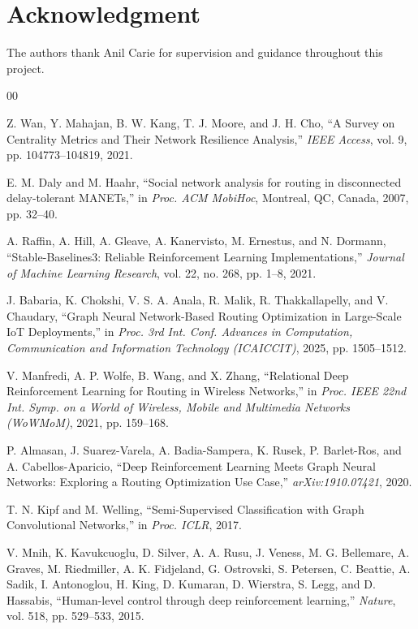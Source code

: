 \documentclass[conference]{IEEEtran}
\begin{document}
\section*{Acknowledgment}
The authors thank Anil Carie for supervision and guidance
throughout this project.

\begin{thebibliography}{00}

Z. Wan, Y. Mahajan, B. W. Kang, T. J. Moore, and J. H. Cho,
``A Survey on Centrality Metrics and Their Network Resilience
Analysis,'' \textit{IEEE Access}, vol. 9,
pp. 104773--104819, 2021.

E. M. Daly and M. Haahr,
``Social network analysis for routing in disconnected
delay-tolerant MANETs,''
in \textit{Proc. ACM MobiHoc}, Montreal, QC, Canada,
2007, pp. 32--40.

A. Raffin, A. Hill, A. Gleave, A. Kanervisto, M. Ernestus, and
N. Dormann, ``Stable-Baselines3: Reliable Reinforcement Learning
Implementations,'' \textit{Journal of Machine Learning Research},
vol. 22, no. 268, pp. 1--8, 2021.

J. Babaria, K. Chokshi, V. S. A. Anala, R. Malik,
R. Thakkallapelly, and V. Chaudary,
``Graph Neural Network-Based Routing Optimization in
Large-Scale IoT Deployments,''
in \textit{Proc. 3rd Int. Conf. Advances in Computation,
Communication and Information Technology (ICAICCIT)},
2025, pp. 1505--1512.

V. Manfredi, A. P. Wolfe, B. Wang, and X. Zhang,
``Relational Deep Reinforcement Learning for Routing in
Wireless Networks,''
in \textit{Proc. IEEE 22nd Int. Symp. on a World of Wireless,
Mobile and Multimedia Networks (WoWMoM)}, 2021, pp. 159--168.

P. Almasan, J. Suarez-Varela, A. Badia-Sampera, K. Rusek,
P. Barlet-Ros, and A. Cabellos-Aparicio,
``Deep Reinforcement Learning Meets Graph Neural Networks:
Exploring a Routing Optimization Use Case,''
\textit{arXiv:1910.07421}, 2020.

T. N. Kipf and M. Welling, ``Semi-Supervised Classification with
Graph Convolutional Networks,'' in \textit{Proc. ICLR}, 2017.

V. Mnih, K. Kavukcuoglu, D. Silver, A. A. Rusu, J. Veness,
M. G. Bellemare, A. Graves, M. Riedmiller, A. K. Fidjeland,
G. Ostrovski, S. Petersen, C. Beattie, A. Sadik, I. Antonoglou,
H. King, D. Kumaran, D. Wierstra, S. Legg, and D. Hassabis,
``Human-level control through deep reinforcement learning,''
\textit{Nature}, vol. 518, pp. 529--533, 2015.


\end{thebibliography}
\end{document}
